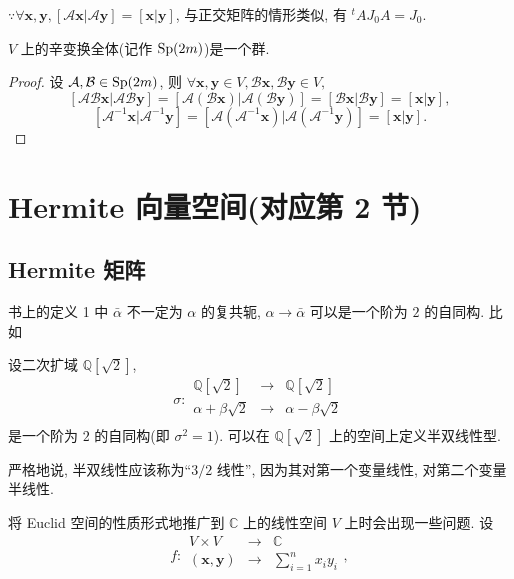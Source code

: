 \documentclass[color=black,device=normal,lang=cn,mode=geye]{elegantnote}
\begin{document}
$\because\forall\boldsymbol{x},\boldsymbol{y},[\mathcal{A}\boldsymbol{x}|\mathcal{A}\boldsymbol{y}]=[\boldsymbol{x}|\boldsymbol{y}]$, 与正交矩阵的情形类似, 有 ${}^tAJ_0A=J_0$.
\begin{theorem}
    $V$ 上的辛变换全体(记作 $\operatorname{Sp} (2m)$)是一个群.
\end{theorem}
\begin{proof}
    设 $\mathcal{A},\mathcal{B}\in\operatorname{Sp} (2m)$, 则 $\forall\boldsymbol{x},\boldsymbol{y}\in V,\mathcal{B}\boldsymbol{x},\mathcal{B}\boldsymbol{y}\in V,$
    \[[\mathcal{AB}\boldsymbol{x}|\mathcal{AB}\boldsymbol{y}]=[\mathcal{A}(\mathcal{B}\boldsymbol{x})|\mathcal{A}(\mathcal{B}\boldsymbol{y})]=[\mathcal{B}\boldsymbol{x}|\mathcal{B}\boldsymbol{y}]=[\boldsymbol{x}|\boldsymbol{y}],\]
    \[[\mathcal{A}^{-1}\boldsymbol{x}|\mathcal{A}^{-1}\boldsymbol{y}]=[\mathcal{A}(\mathcal{A}^{-1}\boldsymbol{x})|\mathcal{A}(\mathcal{A}^{-1}\boldsymbol{y})]=[\boldsymbol{x}|\boldsymbol{y}].\]
\end{proof}
\section{Hermite 向量空间(对应第 2 节)}
\subsection{Hermite 矩阵}
书上的定义 1 中 $\bar{\alpha}$ 不一定为 $\alpha$ 的复共轭, $\alpha\to\bar{\alpha}$ 可以是一个阶为 $2$ 的自同构. 比如
\begin{example}
    设二次扩域 $\mathbb{Q}[\sqrt{2}]$,
    \[\sigma:\begin{array}{rcl}
        \mathbb{Q}[\sqrt{2}] & \to & \mathbb{Q}[\sqrt{2}] \\
        \alpha+\beta\sqrt{2} & \to & \alpha-\beta\sqrt{2} \\
    \end{array}\]
    是一个阶为 $2$ 的自同构(即 $\sigma^2=1$). 可以在 $\mathbb{Q}[\sqrt{2}]$ 上的空间上定义半双线性型.
\end{example}
严格地说, 半双线性应该称为``$3/2$ 线性'', 因为其对第一个变量线性, 对第二个变量半线性.

将 Euclid 空间的性质形式地推广到 $\mathbb{C}$ 上的线性空间 $V$ 上时会出现一些问题. 设
\[f:\begin{array}{rcl}
    V\times V & \to & \mathbb{C} \\
    (\boldsymbol{x},\boldsymbol{y}) & \to & \sum\limits_{i=1}^nx_iy_i \\
\end{array},\]
\end{document}
